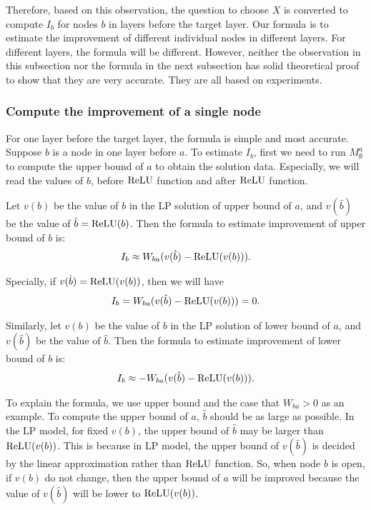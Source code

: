 Therefore, based on this observation, the question to choose $X$ is converted to compute $I_b$ for nodes $b$ in layers before the target layer. Our formula is to estimate the improvement of different individual nodes in different layers. For different layers, the formula will be different.  However, neither the observation in this subsection nor the formula in the next subsection has solid theoretical proof to show that they are very accurate. They are all based on experiments. 

\subsubsection*{Compute the improvement of a single node}


For one layer before the target layer, the formula is simple and most accurate. Suppose $b$ is a node in one layer before $a$. To estimate $I_b$, first we need to run $M^a_{\emptyset}$ to compute the upper bound of $a$  to obtain the solution data. Especially, we will read the values of $b$, before $\mathrm{ReLU}$ function and after $\mathrm{ReLU}$ function.

\begin{definition}
	Let $v(b)$ be the value of $b$ in the LP solution of upper bound of $a$, and $v(\hat{b})$ be the value of $\hat{b}=\mathrm{ReLU}(b)$.	Then the formula to estimate improvement of upper bound of $b$ is: \begin{align}
		I_b \approx W_{ba}(v(\hat{b})-\mathrm{ReLU}(v(b))).
	\end{align}
	
	Specially, if $v(\hat{b})=\mathrm{ReLU}(v(b))$, then we will have \begin{align*}
		I_b = W_{ba}(v(\hat{b})-\mathrm{ReLU}(v(b))) = 0.
	\end{align*}
	
	
	Similarly, let $v(b)$ be the value of $b$ in the LP solution of lower bound of $a$, and $v(\hat{b})$ be the value of $\hat{b}$. Then the formula to estimate improvement of lower bound of $b$ is: \begin{align*}
		I_b \approx -W_{ba}(v(\hat{b})-\mathrm{ReLU}(v(b))).
	\end{align*}
	
\end{definition}

To explain the formula, we use upper bound and the case that $W_{ba} > 0$ as an example. To compute the upper bound of $a$, $\hat{b}$ should be as large as possible. In the LP model, for fixed $v(b)$, the upper bound of $\hat{b}$ may be larger than $\mathrm{ReLU}(v(b))$. This is because in LP model, the upper bound of $v(\hat{b})$ is decided by the linear approximation rather than $\mathrm{ReLU}$ function. So, when node $b$ is open, if $v(b)$ do not change, then the upper bound of $a$ will be improved because the value of $v(\hat{b})$ will be lower to $\mathrm{ReLU}(v(b))$.
 			
